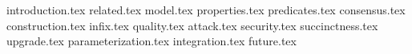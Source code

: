{introduction.tex}
{related.tex}
{model.tex}
{properties.tex}
{predicates.tex}
{consensus.tex}
{construction.tex}
{infix.tex}
{quality.tex}
{attack.tex}
{security.tex}
{succinctness.tex}
{upgrade.tex}
{parameterization.tex}
{integration.tex}
{future.tex}
